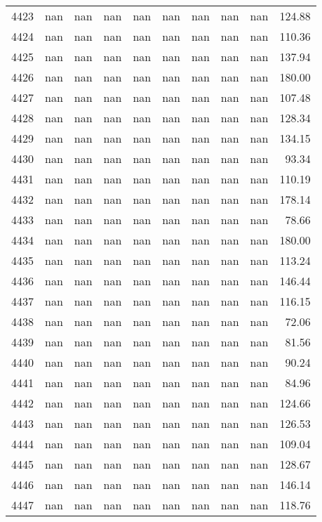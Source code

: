 \begin{tabular}{lrrrrrrrrr}
4423 & nan & nan & nan & nan & nan & nan & nan & nan & 124.88 \\
4424 & nan & nan & nan & nan & nan & nan & nan & nan & 110.36 \\
4425 & nan & nan & nan & nan & nan & nan & nan & nan & 137.94 \\
4426 & nan & nan & nan & nan & nan & nan & nan & nan & 180.00 \\
4427 & nan & nan & nan & nan & nan & nan & nan & nan & 107.48 \\
4428 & nan & nan & nan & nan & nan & nan & nan & nan & 128.34 \\
4429 & nan & nan & nan & nan & nan & nan & nan & nan & 134.15 \\
4430 & nan & nan & nan & nan & nan & nan & nan & nan & 93.34 \\
4431 & nan & nan & nan & nan & nan & nan & nan & nan & 110.19 \\
4432 & nan & nan & nan & nan & nan & nan & nan & nan & 178.14 \\
4433 & nan & nan & nan & nan & nan & nan & nan & nan & 78.66 \\
4434 & nan & nan & nan & nan & nan & nan & nan & nan & 180.00 \\
4435 & nan & nan & nan & nan & nan & nan & nan & nan & 113.24 \\
4436 & nan & nan & nan & nan & nan & nan & nan & nan & 146.44 \\
4437 & nan & nan & nan & nan & nan & nan & nan & nan & 116.15 \\
4438 & nan & nan & nan & nan & nan & nan & nan & nan & 72.06 \\
4439 & nan & nan & nan & nan & nan & nan & nan & nan & 81.56 \\
4440 & nan & nan & nan & nan & nan & nan & nan & nan & 90.24 \\
4441 & nan & nan & nan & nan & nan & nan & nan & nan & 84.96 \\
4442 & nan & nan & nan & nan & nan & nan & nan & nan & 124.66 \\
4443 & nan & nan & nan & nan & nan & nan & nan & nan & 126.53 \\
4444 & nan & nan & nan & nan & nan & nan & nan & nan & 109.04 \\
4445 & nan & nan & nan & nan & nan & nan & nan & nan & 128.67 \\
4446 & nan & nan & nan & nan & nan & nan & nan & nan & 146.14 \\
4447 & nan & nan & nan & nan & nan & nan & nan & nan & 118.76 \\

\end{tabular}
